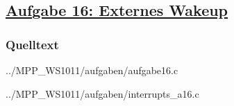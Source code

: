 \subsection*
{\href{http://cst.mi.fu-berlin.de/intern/19606-P-MPP/Aufgaben/040503.html}
{Aufgabe 16: Externes Wakeup}}

\subsubsection*{Quelltext}

{../MPP_WS1011/aufgaben/aufgabe16.c}


{../MPP_WS1011/aufgaben/interrupts_a16.c}

